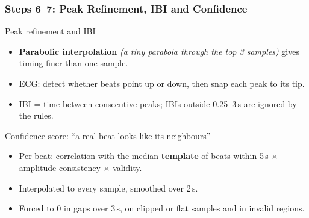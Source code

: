 \documentclass[t,aspectratio=169]{beamer}
\newcommand{\plain}[1]{{\color{gray}\textit{(#1)}}}
\begin{document}
\begin{frame}
\frametitle{Steps 6--7: Peak Refinement, IBI and Confidence}
\begin{block}{Peak refinement and IBI}
\begin{itemize}
  \item \textbf{Parabolic interpolation} \plain{a tiny parabola through the top 3 samples} gives timing finer than
        one sample.
  \item ECG: detect whether beats point up or down, then snap each peak to its tip.
  \item IBI = time between consecutive peaks; IBIs outside 0.25--3\,s are ignored by the rules.
\end{itemize}
\end{block}
\begin{exampleblock}{Confidence score: ``a real beat looks like its neighbours''}
\begin{itemize}
  \item Per beat: correlation with the median \textbf{template} of beats within 5\,s $\times$ amplitude
        consistency $\times$ validity.
  \item Interpolated to every sample, smoothed over 2\,s.
  \item Forced to 0 in gaps over 3\,s, on clipped or flat samples and in invalid regions.
\end{itemize}
\end{exampleblock}
\end{frame}
\end{document}
